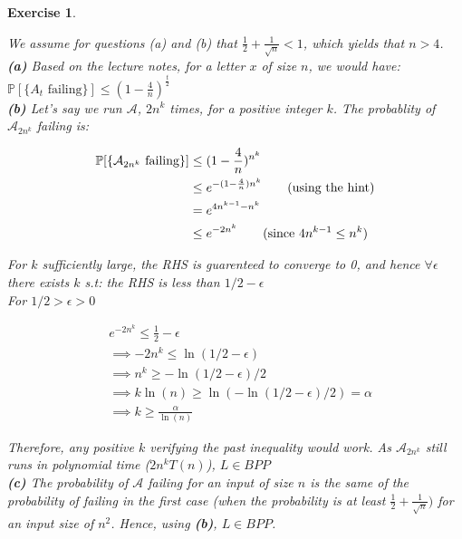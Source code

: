 \documentclass{article}
\newtheorem{exo}{Exercise}
\def\P{\mathbb{P}}
\begin{document}
\begin{exo}{\ \\}

We assume for questions (a) and (b) that $\frac{1}{2}+\frac{1}{\sqrt{n}} < 1$, which yields that $n > 4$.   \\
\noindent
\textbf{(a)}
Based on the lecture notes, for a letter $x$ of size $n$, we would have: $ \P[\{ \text{{$A_t$ failing}} \}] \leq (1-\frac{4}{n})^{\frac{t}{2}} $ \\


\noindent
\textbf{(b)} Let's say we run $\mathcal{A}$, $2n^k$ times, for a positive integer $k$. The probablity of $\mathcal{A}_{2n^k}$ failing is:


\begin{align*}
    \P[\text{\{$\mathcal{A}_{2n^k}$ failing\}}] &\leq (1-\frac{4}{n})^{n^k} \\
    &\leq e^{-(1-\frac{4}{n})n^k}   \text{\quad \quad (using the hint)} \\
    &= e^{4n^{k-1} - n^k} \\
    &\leq e^{-2n^k}  \text{\quad \quad (since $4n^{k-1} \leq n^k$)} \\
\end{align*}
 
For $k$ sufficiently large, the RHS is guarenteed to converge to 0, and hence $\forall \epsilon$ there exists $k$ s.t: the RHS is less than $1/2 - \epsilon$ \\

For $1/2 >\epsilon > 0$

\begin{align*}
    & e^{-2n^k} \leq \frac{1}{2} - \epsilon \\
    &\implies -2n^k \leq \ln(1/2 - \epsilon) \\
    &\implies n^k \geq -\ln(1/2 - \epsilon)/2 \\
    &\implies k \ln(n) \geq  \ln(-\ln(1/2 - \epsilon)/2) = \alpha \\
    &\implies k \geq \frac{\alpha}{\ln(n)} 
\end{align*}

Therefore, any positive $k$ verifying the past inequality would work. As $\mathcal{A}_{2n^k}$ still runs in polynomial time ($2n^k T(n)$), $L \in BPP$  \\ 


  \noindent
\textbf{(c)}
The probability of $\mathcal{A}$ failing for an input of size $n$ is the same of the probability of failing in the first case (when the probability is at least $\frac{1}{2}+\frac{1}{\sqrt{n}})$ for an input size of $n^2$. Hence, using \textbf{(b)}, $L \in BPP$.

\end{exo}
\end{document}
